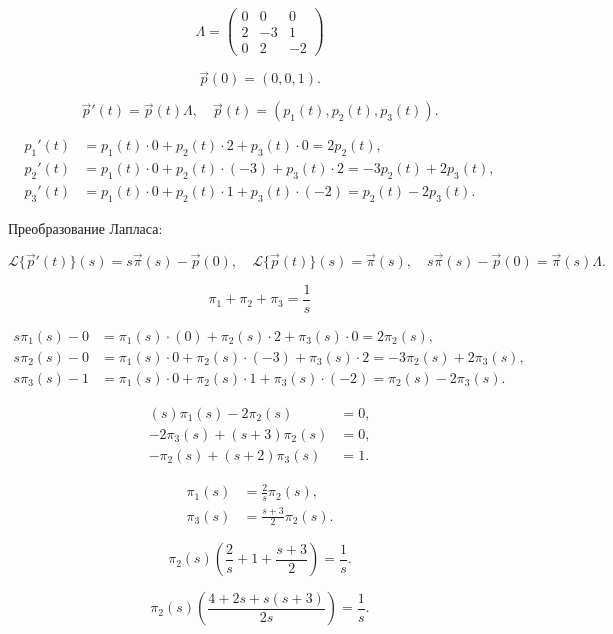 \[
	\Lambda =
	\begin{pmatrix}
		0 & 0  & 0  \\
		2 & -3 & 1  \\
		0 & 2  & -2
	\end{pmatrix}
\]

\[
	\vec{p}(0) = (0,0,1).
\]

\[
	\vec{p}'(t) = \vec{p}(t)\Lambda,\quad \vec{p}(t)=(p_1(t),p_2(t),p_3(t)).
\]

\[
	\begin{aligned}
		p_1'(t) & = p_1 (t)\cdot 0 + p_2(t)\cdot 2 + p_3(t)\cdot 0 = 2p_2(t),            \\
		p_2'(t) & = p_1 (t)\cdot 0 + p_2(t)\cdot(-3) + p_3(t)\cdot 2 = -3p_2(t)+2p_3(t), \\
		p_3'(t) & = p_1 (t)\cdot 0 + p_2(t)\cdot 1 + p_3(t)\cdot(-2) = p_2(t)-2p_3(t).
	\end{aligned}
\]

Преобразование Лапласа:

\[
	\mathcal{L}\{\vec p'(t)\}(s)=s \vec \pi(s)-\vec p(0)
	,\quad
	\mathcal{L}\{\vec p(t)\}(s)=\vec \pi(s)
	,\quad
	s \vec \pi(s)-\vec p(0)=\vec \pi(s)\Lambda.
\]

\[
	\pi_1+\pi_2+\pi_3=\frac{1}{s}
\]

\[
	\begin{aligned}
		s \pi_1(s)-0 & = \pi_1(s)\cdot(0) + \pi_2(s)\cdot 2 + \pi_3(s)\cdot 0 = 2\pi_2(s),             \\
		s \pi_2(s)-0 & = \pi_1(s)\cdot 0 + \pi_2(s)\cdot(-3) + \pi_3(s)\cdot 2 = -3\pi_2(s)+2\pi_3(s), \\
		s \pi_3(s)-1 & = \pi_1(s)\cdot 0 + \pi_2(s)\cdot 1 + \pi_3(s)\cdot(-2) = \pi_2(s)-2\pi_3(s).
	\end{aligned}
\]

\[
	\begin{aligned}
		(s)\pi_1(s)-2\pi_2(s)    & = 0, \\
		-2\pi_3(s)+(s+3)\pi_2(s) & = 0, \\
		-\pi_2(s)+(s+2)\pi_3(s)  & = 1.
	\end{aligned}
\]

\[
	\begin{aligned}
		\pi_1(s) & = \frac{2}{s}\pi_2(s),   \\
		\pi_3(s) & = \frac{s+3}{2}\pi_2(s).
	\end{aligned}
\]

\[
	\pi_2(s)\left(\frac{2}{s}+1+\frac{s+3}{2}\right) = \frac{1}{s}.
\]

\[
	\pi_2(s)\left(\frac{4+2s+s(s+3)}{2s}\right) = \frac{1}{s}.
\]

